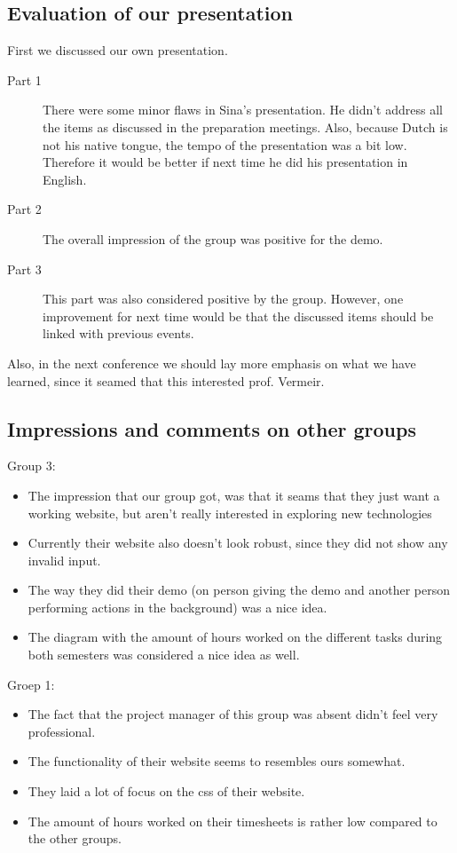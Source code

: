 \documentclass[a4paper, 12pt]{article}
\begin{document}
		\subsection{Evaluation of our presentation}
			First we discussed our own presentation.
			\begin{description}
				\item[Part 1] There were some minor flaws in Sina's presentation. He didn't address all the items as discussed in the preparation meetings. Also, because Dutch is not his native tongue, the tempo of the presentation was a bit low. Therefore it would be better if next time he did his presentation in English.
				\item[Part 2] The overall impression of the group was positive for the demo.
				\item[Part 3] This part was also considered positive by the group. However, one improvement for next time would be that the discussed items should be linked with previous events.
			\end{description}
			Also, in the next conference we should lay more emphasis on what we have learned, since it seamed that this interested prof. Vermeir.

		\subsection{Impressions and comments on other groups}
		Group 3:
		\begin{itemize}
			\item The impression that our group got, was that it seams that they just want a working website, but aren't really interested in exploring new technologies
			\item Currently their website also doesn't look robust, since they did not show any invalid input.
			\item The way they did their demo (on person giving the demo and another person performing actions in the background) was a nice idea.
			\item The diagram with the amount of hours worked on the different tasks during both semesters was considered a nice idea as well.
		\end{itemize}
		Groep 1:
		\begin{itemize}
			\item The fact that the project manager of this group was absent didn't feel very professional. 
			\item	 The functionality of their website seems to resembles ours somewhat.
			\item They laid a lot of focus on the css of their website.
			\item The amount of hours worked on their timesheets is rather low compared to the other groups.
		\end{itemize}
\end{document}

